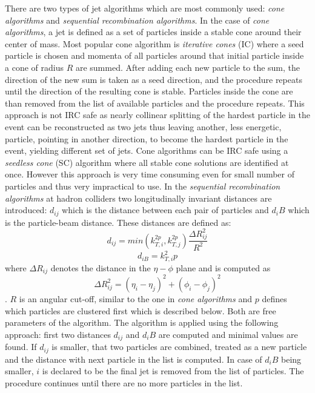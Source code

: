 \par There are two types of jet algorithms which are most commonly used: \textit{cone algorithms} and \textit{sequential recombination algorithms}. In the case of \textit{cone algorithms}, a jet is defined as a set of particles inside a stable cone around their center of mass. Most popular cone algorithm is \textit{iterative cones} (IC) where a seed particle is chosen and momenta of all particles around that initial particle inside a cone of radius $R$ are summed. After adding each new particle to the sum, the direction of the new sum is taken as a seed direction, and the procedure repeats until the direction of the resulting cone is stable. Particles inside the cone are than removed from the list of available particles and the procedure repeats. This approach is not IRC safe as nearly collinear splitting of the hardest particle in the event can be reconstructed as two jets thus leaving another, less energetic, particle, pointing in another direction, to become the hardest particle in the event, yielding different set of jets. Cone algorithms can be IRC safe using a \textit{seedless cone} (SC) algorithm where all stable cone solutions are identified at once. However this approach is very time consuming even for small number of particles and thus very impractical to use.
In the \textit{sequential recombination algorithms} at hadron colliders two longitudinally invariant distances are introduced: $d_{ij}$ which is the distance between each pair of particles and $d_iB$ which is the particle-beam distance. These distances are defined as: 
\begin{equation}
d_{ij} = min(k_{T,i}^{2p},k_{T,j}^{2p}) \frac{\Delta R_{ij}^2}{R^2}
\end{equation}
\begin{equation}
d_{iB}=k_{T,i}^2p
\end{equation}
where $\Delta R_{ij}$ denotes the distance in the $\eta -\phi$ plane and is computed as $$\Delta R_{ij}^2 = (\eta_i-\eta_j)^2+(\phi_i-\phi_j)^2$$. $R$ is an angular cut-off, similar to the one in \textit{cone algorithms} and $p$ defines which particles are clustered first which is described below. Both are free parameters of the algorithm. The algorithm is applied using the following approach: first two distances $d_{ij}$ and $d_iB$ are computed and minimal values are found. If $d_{ij}$ is smaller, that two particles are combined, treated as a new particle and the distance with next particle in the list is computed. In case of $d_iB$ being smaller, $i$ is declared to be the final jet is removed from the list of particles. The procedure continues until there are no more particles in the list.
